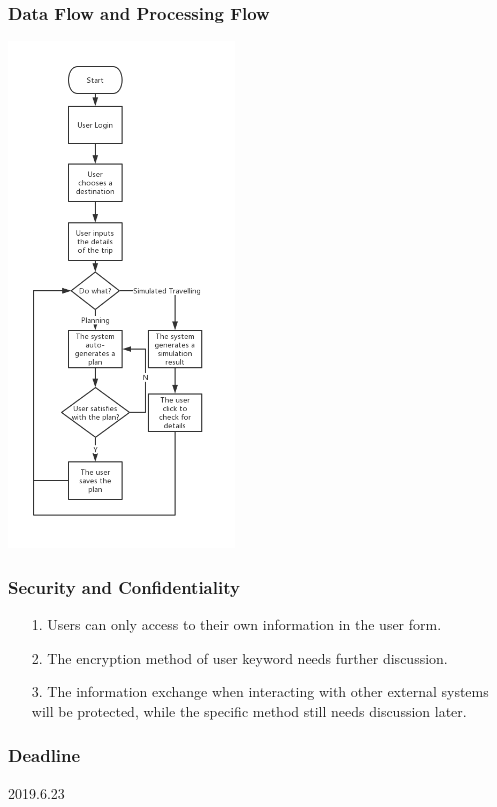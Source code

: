 \documentclass[10pt]{article}
\begin{document}
\subsubsection{Data Flow and Processing Flow}
\begin{center}
  \includegraphics[width=6cm]{test.png}
\end{center}

\subsubsection{Security and Confidentiality}
\begin{itemize}
  \item[1.] Users can only access to their own information in the user form.
  \item[2.] The encryption method of user keyword needs further discussion.
  \item[3.] The information exchange when interacting with other external systems will be protected, while the specific method still needs discussion later.
\end{itemize}

\subsubsection{Deadline}
2019.6.23
\end{document}
